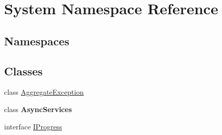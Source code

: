 \hypertarget{namespace_system}{}\section{System Namespace Reference}
\label{namespace_system}
\subsection*{Namespaces}
\begin{DoxyCompactItemize}
\end{DoxyCompactItemize}
\subsection*{Classes}
\begin{DoxyCompactItemize}
\item 
class \hyperlink{class_system_1_1_aggregate_exception}{Aggregate\+Exception}
\item 
class {\bfseries Async\+Services}
\item 
interface \hyperlink{interface_system_1_1_i_progress}{I\+Progress}
\end{DoxyCompactItemize}
